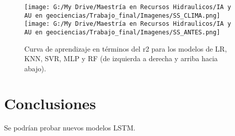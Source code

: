 \documentclass[draft]{agujournal2019}
\begin{document}
\begin{figure}[!]
	\centering%
	\texttt{[image: G:/My Drive/Maestría en Recursos Hidraulicos/IA y AU en geociencias/Trabajo\_final/Imagenes/SS\_CLIMA.png]}
	\texttt{[image: G:/My Drive/Maestría en Recursos Hidraulicos/IA y AU en geociencias/Trabajo\_final/Imagenes/SS\_ANTES.png]}
	\caption{Curva de aprendizaje en términos del r2 para los modelos de LR, KNN, SVR, MLP y RF (de izquierda a derecha y arriba hacia abajo).} \label{fig:SS}
\end{figure}


\section{Conclusiones}

Se podrían probar nuevos modelos LSTM.







%
%
%
%
%
%
%
%
%
%
\end{document}

